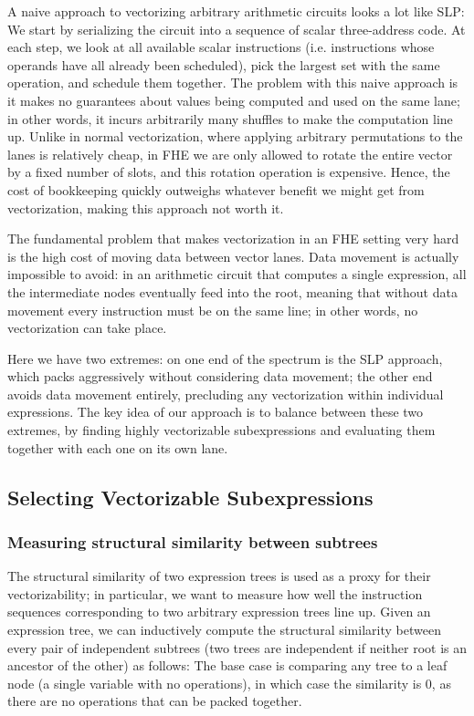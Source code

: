A naive approach to vectorizing arbitrary arithmetic circuits looks a lot like SLP: We start by serializing the circuit into a sequence of scalar three-address code.
At each step, we look at all available scalar instructions (i.e. instructions whose operands have all already been scheduled), pick the largest set with the same operation, and schedule them together.
The problem with this naive approach is it makes no guarantees about values being computed and used on the same lane; in other words, it incurs arbitrarily many shuffles to make the computation line up. 
Unlike in normal vectorization, where applying arbitrary permutations to the lanes is relatively cheap, in FHE we are only allowed to rotate the entire vector by a fixed number of slots, and this rotation operation is expensive.
Hence, the cost of bookkeeping quickly outweighs whatever benefit we might get from vectorization, making this approach not worth it.

The fundamental problem that makes vectorization in an FHE setting very hard is the high cost of moving data between vector lanes. 
Data movement is actually impossible to avoid: in an arithmetic circuit that computes a single expression, all the intermediate nodes eventually feed into the root, meaning that without data movement every instruction must be on the same line; in other words, no vectorization can take place.

Here we have two extremes: on one end of the spectrum is the SLP approach, which packs aggressively without considering data movement; the other end avoids data movement entirely, precluding any vectorization within individual expressions.
The key idea of our approach is to balance between these two extremes, by finding highly vectorizable subexpressions and evaluating them together with each one on its own lane.

\subsection{Selecting Vectorizable Subexpressions} 
\subsubsection*{Measuring structural similarity between subtrees}
The structural similarity of two expression trees is used as a proxy for their vectorizability; in particular, we want to measure how well the instruction sequences corresponding to two arbitrary expression trees line up.
Given an expression tree, we can inductively compute the structural similarity between every pair of independent subtrees (two trees are independent if neither root is an ancestor of the other) as follows:
The base case is comparing any tree to a leaf node (a single variable with no operations), in which case the similarity is $0$, as there are no operations that can be packed together.

